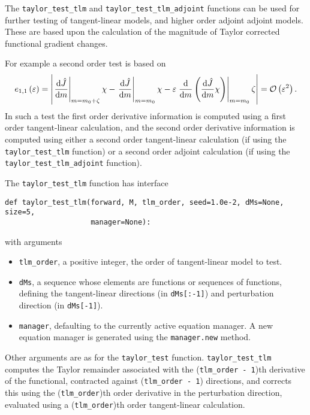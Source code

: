 \documentclass[11pt]{article}
\begin{document}
The \texttt{taylor\_test\_tlm} and \texttt{taylor\_test\_tlm\_adjoint}
functions can be used for further testing of tangent-linear models, and higher
order adjoint adjoint models. These are based upon the calculation of the
magnitude of Taylor corrected functional gradient changes.

For example a second order test is based on
\begin{equation*}
  e_{1,1} \left( \varepsilon \right) = \left|
    \left. \frac{\mathrm{d} \hat{J}}{\mathrm{d} m} \right|_{m = m_0 + \zeta} \chi
    - \left. \frac{\mathrm{d} \hat{J}}{\mathrm{d} m} \right|_{m = m_0} \chi
    - \varepsilon \left. \frac{\mathrm{d}}{\mathrm{d} m} \left( \frac{\mathrm{d} \hat{J}}{\mathrm{d} m} \chi \right) \right|_{m = m_0} \zeta
    \right| = {\cal O} \left( \varepsilon^2 \right).
\end{equation*}
In such a test the first order derivative information is computed using a first
order tangent-linear calculation, and the second order derivative information
is computed using either a second order tangent-linear calculation (if using
the \texttt{taylor\_test\_tlm} function) or a second order adjoint calculation
(if using the \texttt{taylor\_test\_tlm\_adjoint} function).

The \texttt{taylor\_test\_tlm} function has interface
\begin{lstlisting}
def taylor_test_tlm(forward, M, tlm_order, seed=1.0e-2, dMs=None, size=5,
                    manager=None):
\end{lstlisting}
with arguments
\begin{itemize}
  \item \texttt{tlm\_order}, a positive integer, the order of tangent-linear
    model to test.
  \item \texttt{dMs}, a sequence whose elements are functions or sequences of
    functions, defining the tangent-linear directions (in \texttt{dMs[:-1]})
    and perturbation direction (in \texttt{dMs[-1]}).
  \item \texttt{manager}, defaulting to the currently active equation manager.
    A new equation manager is generated using the \texttt{manager.new} method.
\end{itemize}
Other arguments are as for the \texttt{taylor\_test} function.
\texttt{taylor\_test\_tlm} computes the Taylor remainder associated with the
(\texttt{tlm\_order - 1})th derivative of the functional, contracted against
(\texttt{tlm\_order - 1}) directions, and corrects this using the
(\texttt{tlm\_order})th order derivative in the perturbation direction,
evaluated using a (\texttt{tlm\_order})th order tangent-linear calculation.
\end{document}
